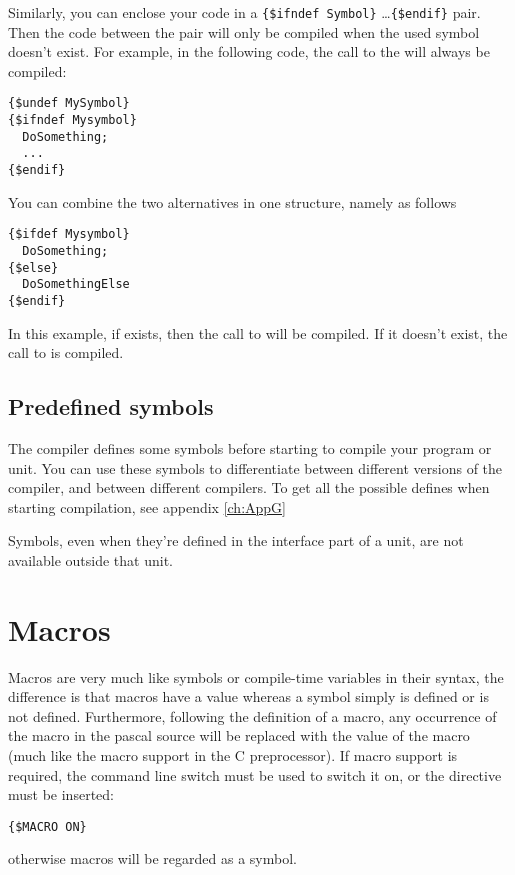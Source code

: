 Similarly, you can enclose your code in a \verb|{$ifndef Symbol}| \dots \verb|{$endif}|
pair. Then the code between the pair will only be compiled when the used
symbol doesn't exist. For example, in the following code, the call to the
 will always be compiled:
\begin{verbatim}
{$undef MySymbol}
{$ifndef Mysymbol}
  DoSomething;
  ...
{$endif}
\end{verbatim}

You can combine the two alternatives in one structure, namely as follows
\begin{verbatim}
{$ifdef Mysymbol}
  DoSomething;
{$else}
  DoSomethingElse
{$endif}
\end{verbatim}
In this example, if  exists, then the call to 
will be compiled. If it doesn't exist, the call to  is
compiled.

\subsection{Predefined symbols}

The \fpc compiler defines some symbols before starting to compile your
program or unit. You can use these symbols to differentiate between
different versions of the compiler, and between different compilers.
To get all the possible defines when starting compilation,
see appendix \ref{ch:AppG}

\begin{remark}Symbols, even when they're defined in the interface part of
a unit, are not available outside that unit.
\end{remark}

\section{Macros}
\label{se:Macros}
Macros are very much like symbols or compile-time variables in their syntax, 
the difference is that macros have a value whereas a symbol simply is defined 
or is not defined. Furthermore, following the definition of a macro, any
occurrence of the macro in the pascal source will be replaced with the value
of the macro (much like the macro support in the C preprocessor). If macro 
support is required, the  command line switch must be used to
switch it on, or the directive must be inserted:
\begin{verbatim}
{$MACRO ON}
\end{verbatim}
otherwise macros will be regarded as a symbol.

